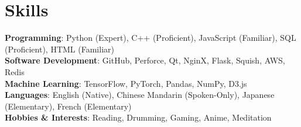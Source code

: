 \section{Skills}
 \begin{itemize}[leftmargin=0.5cm, label={}]
    \small{\item{
     \textbf{Programming}{: Python (Expert), C++ (Proficient), JavaScript (Familiar), SQL (Proficient), HTML (Familiar)} \\
     \textbf{Software Development}{: GitHub, Perforce, Qt, NginX, Flask, Squish, AWS, Redis} \\
     \textbf{Machine Learning}{: TensorFlow, PyTorch, Pandas, NumPy, D3.js} \\
     \textbf{Languages}{: English (Native), Chinese Mandarin (Spoken-Only), Japanese (Elementary), French (Elementary)} \\
     \textbf{Hobbies \& Interests}{: Reading, Drumming, Gaming, Anime, Meditation} \\
    }}
 \end{itemize}